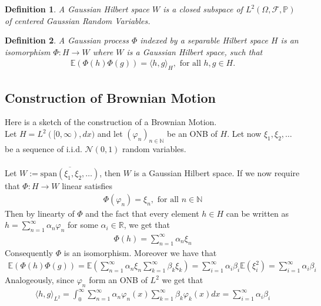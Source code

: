 \documentclass[11pt,a4paper, final]{article}
\newtheorem{defn}{Definition}[section]
\theoremstyle{definition}
\begin{document}
\begin{defn} A Gaussian Hilbert space $W$ is a closed subspace of $L^2( \Omega, \mathcal{F}, \mathbb{P})$ of centered Gaussian Random Variables.
\end{defn}
\begin{defn} A Gaussian process $\Phi$ indexed by a separable Hilbert space $H$ is an isomorphism $\Phi : H \to W$ where $W$ is a Gaussian Hilbert space, such that 
\begin{align*}
\mathbb{E}( \Phi(h) \Phi(g)) = \langle h , g \rangle_H, \text{ for all } h,g \in H. 
\end{align*}
\end{defn}
\newpage
\subsection{Construction of Brownian Motion}
\noindent Here is a sketch of the construction of a Brownian Motion. \\ Let $H= L^2([0, \infty), dx)$ and let $( \varphi_n)_{n \in \mathbb{N}}$ be an ONB of $H$. Let now $\xi_1, \xi_2, \dots $ be a sequence of i.i.d. $\mathcal{N}(0,1)$ random variables. 
\\\\
Let $W:= \overline{\text{span}( \xi_1, \xi_2, \dots )}$, then $W$ is a Gaussian Hilbert space. If we now require that $\Phi: H \to W$ linear satisfies \begin{align*}
\Phi( \varphi_n) = \xi_n, \text{ for all } n \in \mathbb{N}
\end{align*}
Then by linearty of $\Phi$ and the fact that every element $h \in H$ can be written as $h = \sum_{n=1}^\infty \alpha_n \varphi_n$ for some $\alpha_i \in \mathbb{R}$, we get that 
\begin{align*}
\Phi(h) = \sum_{n=1}^\infty \alpha_n \xi_n 
\end{align*}
Consequently $\Phi$ is an isomorphism. Moreover we have that 
\begin{align*}
\mathbb{E}( \Phi(h) \Phi(g)) = \mathbb{E} \left( \sum_{n=1}^\infty \alpha_n \xi_n \sum_{k=1}^\infty \beta_k \xi_k \right) = \sum_{i=1}^\infty \alpha_i \beta_i \mathbb{E}( \xi_i^2) = \sum_{i=1}^\infty \alpha_i \beta_i 
\end{align*}
Analogeously, since $ \varphi_n$ form an ONB of $L^2$ we get that 
\begin{align*}
\langle h, g \rangle_{L^2} = \int_0^\infty \sum_{n=1}^\infty \alpha_n \varphi_n(x) \sum_{k=1}^\infty \beta_k \varphi_k(x) dx = \sum_{i=1}^\infty \alpha_i \beta_i 
\end{align*}
\end{document}
